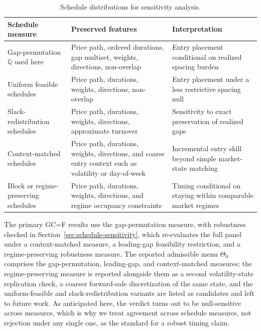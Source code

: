 \documentclass[risks,article,submit,pdftex,oneauthor]{Definitions/mdpi}
\begin{document}
\begin{table}[H]
\centering
\caption{Schedule distributions for sensitivity analysis.}
\label{tab:schedule_measures}
\small
\renewcommand{\arraystretch}{1.12}
\begin{tabular}{@{}>{\raggedright\arraybackslash}p{}>{\raggedright\arraybackslash}p{}>{\raggedright\arraybackslash}p{}@{}}
\toprule
Schedule measure & Preserved features & Interpretation \\
\midrule
Gap-permutation $\mathbb{Q}$ used here & Price path, ordered durations, gap multiset, weights, directions, non-overlap & Entry placement conditional on realized spacing burden \\
Uniform feasible schedules & Price path, durations, weights, directions, non-overlap & Entry placement under a less restrictive spacing null \\
Slack-redistribution schedules & Price path, durations, weights, directions, approximate turnover & Sensitivity to exact preservation of realized gaps \\
Context-matched schedules & Price path, durations, weights, directions, and coarse entry context such as volatility or day-of-week & Incremental entry skill beyond simple market-state matching \\
Block or regime-preserving schedules & Price path, durations, weights, directions, and regime occupancy constraints & Timing conditional on staying within comparable market regimes \\
\bottomrule
\end{tabular}
\end{table}

The primary GC=F results use the gap-permutation measure, with robustness checked in Section~\ref{sec:schedule-sensitivity}, which re-evaluates the full panel under a context-matched measure, a leading-gap feasibility restriction, and a regime-preserving robustness measure. The reported admissible menu $\Theta_0$ comprises the gap-permutation, leading-gap, and context-matched measures; the regime-preserving measure is reported alongside them as a second volatility-state replication check, a coarser forward-safe discretization of the same state, and the uniform-feasible and slack-redistribution variants are listed as candidates and left to future work. As anticipated here, the verdict turns out to be null-sensitive across measures, which is why we treat agreement across schedule measures, not rejection under any single one, as the standard for a robust timing claim.
\end{document}
